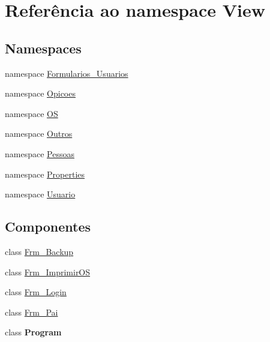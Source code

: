 \hypertarget{namespace_view}{}\section{Referência ao namespace View}
\label{namespace_view}
\subsection*{Namespaces}
\begin{DoxyCompactItemize}
\item 
namespace \hyperlink{namespace_view_1_1_formularios___usuarios}{Formularios\+\_\+\+Usuarios}
\item 
namespace \hyperlink{namespace_view_1_1_opicoes}{Opicoes}
\item 
namespace \hyperlink{namespace_view_1_1_o_s}{O\+S}
\item 
namespace \hyperlink{namespace_view_1_1_outros}{Outros}
\item 
namespace \hyperlink{namespace_view_1_1_pessoas}{Pessoas}
\item 
namespace \hyperlink{namespace_view_1_1_properties}{Properties}
\item 
namespace \hyperlink{namespace_view_1_1_usuario}{Usuario}
\end{DoxyCompactItemize}
\subsection*{Componentes}
\begin{DoxyCompactItemize}
\item 
class \hyperlink{class_view_1_1_frm___backup}{Frm\+\_\+\+Backup}
\item 
class \hyperlink{class_view_1_1_frm___imprimir_o_s}{Frm\+\_\+\+Imprimir\+O\+S}
\item 
class \hyperlink{class_view_1_1_frm___login}{Frm\+\_\+\+Login}
\item 
class \hyperlink{class_view_1_1_frm___pai}{Frm\+\_\+\+Pai}
\item 
class {\bfseries Program}
\end{DoxyCompactItemize}
